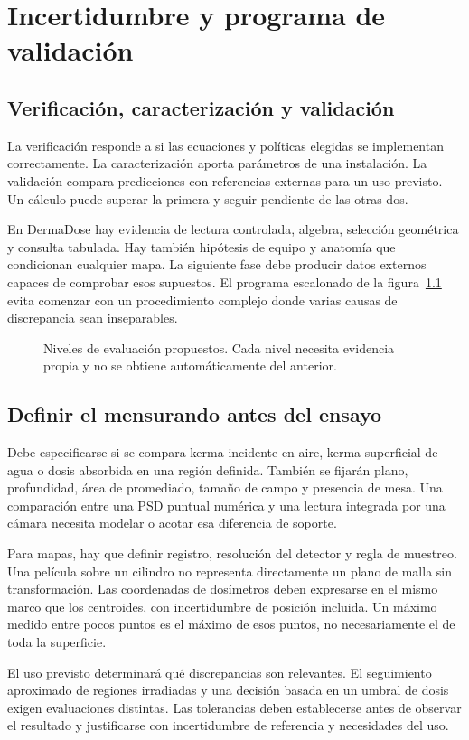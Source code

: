 \chapter{Incertidumbre y programa de validación}
\section{Verificación, caracterización y validación}
La verificación responde a si las ecuaciones y políticas elegidas se implementan correctamente. La caracterización aporta parámetros de una instalación. La validación compara predicciones con referencias externas para un uso previsto. Un cálculo puede superar la primera y seguir pendiente de las otras dos.

En DermaDose hay evidencia de lectura controlada, algebra, selección geométrica y consulta tabulada. Hay también hipótesis de equipo y anatomía que condicionan cualquier mapa. La siguiente fase debe producir datos externos capaces de comprobar esos supuestos. El programa escalonado de la figura~\ref{fig:valid} evita comenzar con un procedimiento complejo donde varias causas de discrepancia sean inseparables.
\begin{figure}[htbp]\centering
\caption{Niveles de evaluación propuestos. Cada nivel necesita evidencia propia y no se obtiene automáticamente del anterior.}\label{fig:valid}\end{figure}

\section{Definir el mensurando antes del ensayo}
Debe especificarse si se compara kerma incidente en aire, kerma superficial de agua o dosis absorbida en una región definida. También se fijarán plano, profundidad, área de promediado, tamaño de campo y presencia de mesa. Una comparación entre una PSD puntual numérica y una lectura integrada por una cámara necesita modelar o acotar esa diferencia de soporte.

Para mapas, hay que definir registro, resolución del detector y regla de muestreo. Una película sobre un cilindro no representa directamente un plano de malla sin transformación. Las coordenadas de dosímetros deben expresarse en el mismo marco que los centroides, con incertidumbre de posición incluida. Un máximo medido entre pocos puntos es el máximo de esos puntos, no necesariamente el de toda la superficie.

El uso previsto determinará qué discrepancias son relevantes. El seguimiento aproximado de regiones irradiadas y una decisión basada en un umbral de dosis exigen evaluaciones distintas. Las tolerancias deben establecerse antes de observar el resultado y justificarse con incertidumbre de referencia y necesidades del uso.


